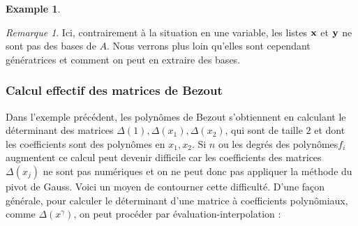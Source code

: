 \documentclass{article}
\theoremstyle{plain}%
\theoremstyle{definition}
\newtheorem{exmp}{Example}
\theoremstyle{remark}
\newtheorem*{rem}{Remarque}
\begin{document}
\begin{exmp}
\end{exmp}
\begin{rem}
Ici, contrairement à la situation en une variable, les listes $\bold{x}$ et $\bold{y}$ ne sont pas des bases de $A$. Nous verrons plus loin qu'elles sont cependant génératrices et comment on peut en extraire des bases.
\end{rem}
\subsubsection{Calcul effectif des matrices de Bezout}
Dans l'exemple précédent, les polynômes de Bezout s'obtiennent en calculant le déterminant des matrices $\Delta(1), \Delta(x_1), \Delta(x_2)$, qui sont de taille $2$ et dont les coefficients sont des polynômes en $x_1, x_2$. Si $n$ ou les degrés des polynômes$f_i$ augmentent ce calcul peut devenir difficile car les coefficients des matrices $\Delta(x_j)$ ne sont pas numériques et on ne peut donc pas appliquer la méthode du pivot de Gauss. Voici un moyen de contourner cette difficulté. D'une façon générale, pour calculer le déterminant d'une matrice à coefficients polynômiaux, comme $\Delta(x^\gamma)$, on peut procéder par évaluation-interpolation :
\end{document}
